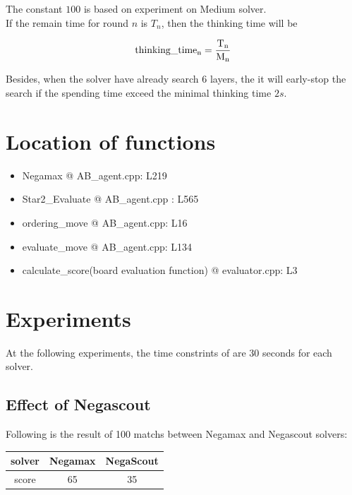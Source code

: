 \documentclass[a4paper, 12pt]{article}  %
\begin{document}
The constant $100$ is based on experiment on Medium solver.\\
If the remain time for round $n$ is $T_n$, then the thinking time will be

\begin{equation*}
  \rm thinking\_time_n = \frac{T_n}{M_n}
\end{equation*}

Besides, when the solver have already search $6$ layers, the it will early-stop the search if the spending time exceed the minimal thinking time $2s$.


\section{Location of functions}
\begin{itemize}
  \item Negamax @ AB\_agent.cpp: L219
  \item Star2\_Evaluate @ AB\_agent.cpp : L565
  \item ordering\_move @ AB\_agent.cpp: L16
  \item evaluate\_move @ AB\_agent.cpp: L134
  \item calculate\_score(board evaluation function) @ evaluator.cpp: L3
\end{itemize}


\section{Experiments}
At the following experiments, the time constrints of are $30$ seconds for each solver.




\subsection{Effect of Negascout}
Following is the result of 100 matchs between Negamax and Negascout solvers:
\begin{table}[!h]
  \begin{tabular}{|c|c|c|}
    solver & Negamax & NegaScout\\
    \hline
    score & 65 & 35
  \end{tabular}
\end{table}
\end{document}
